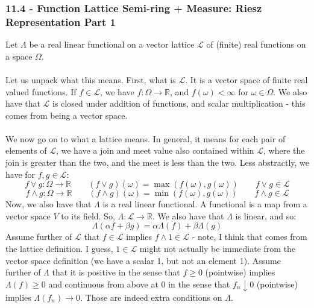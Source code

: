 \documentclass[12pt,a4paper]{article}
\newcommand{\1}[1]{\mathbbm{1}\left\{ #1 \right\}}
\newcommand{\R}{\mathbb{R}}
\newcommand{\lcal}{\mathcal{L}}
\begin{document}
\subsubsection{11.4 - Function Lattice Semi-ring + Measure: Riesz Representation Part 1} Let $\Lambda$ be a real linear functional on a vector lattice $\lcal$ of (finite) real functions on a space $\Omega$.
\\\\
Let us unpack what this means. First, what is $\lcal$. It is a vector space of finite real valued functions. If $f \in \lcal$, we have $f: \Omega \to \R$, and $f(\omega) < \infty$ for $\omega \in \Omega$. We also have that $\lcal$ is closed under addition of functions, and scalar multiplication - this comes from being a vector space.
\\\\
We now go on to what a lattice means. In general, it means for each pair of elements of $\lcal$, we have a join and meet value also contained within $\lcal$, where the join is greater than the two, and the meet is less than the two. Less abstractly, we have for $f,g \in \lcal$:
$$
	f \vee g: \Omega \to \R \quad\quad
	(f \vee g)(\omega) = \max(f(\omega), g(\omega)) \quad\quad
	f \vee g \in \lcal
$$
$$
	f \wedge g: \Omega \to \R \quad\quad
	(f \wedge g)(\omega) = \min(f(\omega), g(\omega)) \quad\quad
	f \wedge g \in \lcal
$$
Now, we also have that $\Lambda$ is a real linear functional. A functional is a map from a vector space $V$ to its field. So, $\Lambda: \lcal \to \R$. We also have that $\Lambda$ is linear, and so:
$$
	\Lambda(\alpha f + \beta g) = \alpha\Lambda(f) + \beta\Lambda(g)
$$
Assume further of $\lcal$ that $f \in \lcal$ implies $f \wedge 1 \in \lcal$ - note, I think that comes from the lattice definition. I guess, $1 \in \lcal$ might not actually be immediate from the vector space definition (we have a scalar 1, but not an element 1). Assume further of $\Lambda$ that it is positive in the sense that $f \geq 0$ (pointwise) implies $\Lambda(f) \geq 0$ and continuous from above at $0$ in the sense that $f_n \downarrow 0$ (pointwise) implies $\Lambda(f_n) \to 0$. Those are indeed extra conditions on $\Lambda$.
\end{document}
